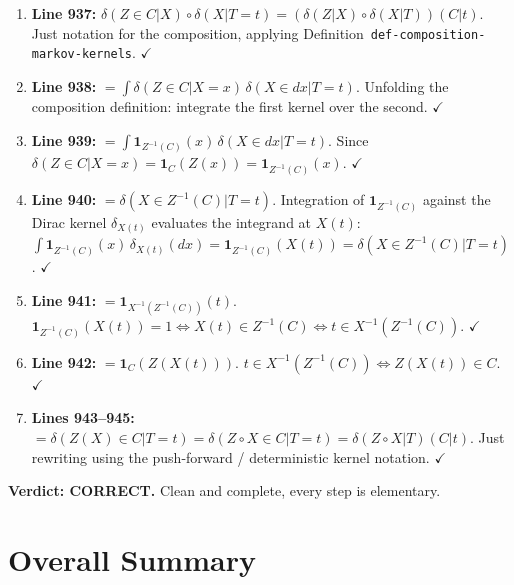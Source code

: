 \documentclass{article}
\begin{document}
\begin{enumerate}[leftmargin=*]
  \item \textbf{Line 937:}
    $\delta(Z\in C|X)\circ\delta(X|T=t) = (\delta(Z|X)\circ\delta(X|T))(C|t)$.
    Just notation for the composition, applying
    Definition~\texttt{def-composition-markov-kernels}.  $\checkmark$

  \item \textbf{Line 938:}
    $= \int \delta(Z\in C|X=x)\,\delta(X\in dx|T=t)$.
    Unfolding the composition definition: integrate the first kernel over the
    second.  $\checkmark$

  \item \textbf{Line 939:}
    $= \int \mathbf{1}_{Z^{-1}(C)}(x)\,\delta(X\in dx|T=t)$.
    Since $\delta(Z\in C|X=x) = \mathbf{1}_C(Z(x)) = \mathbf{1}_{Z^{-1}(C)}(x)$.
    $\checkmark$

  \item \textbf{Line 940:}
    $= \delta(X\in Z^{-1}(C)|T=t)$.
    Integration of $\mathbf{1}_{Z^{-1}(C)}$ against the Dirac kernel $\delta_{X(t)}$
    evaluates the integrand at $X(t)$:
    $\int\mathbf{1}_{Z^{-1}(C)}(x)\,\delta_{X(t)}(dx)
     = \mathbf{1}_{Z^{-1}(C)}(X(t))
     = \delta(X\in Z^{-1}(C)|T=t)$.  $\checkmark$

  \item \textbf{Line 941:}
    $= \mathbf{1}_{X^{-1}(Z^{-1}(C))}(t)$.
    $\mathbf{1}_{Z^{-1}(C)}(X(t)) = 1 \iff X(t)\in Z^{-1}(C) \iff
    t\in X^{-1}(Z^{-1}(C))$.  $\checkmark$

  \item \textbf{Line 942:}
    $= \mathbf{1}_C(Z(X(t)))$.
    $t\in X^{-1}(Z^{-1}(C)) \iff Z(X(t))\in C$.  $\checkmark$

  \item \textbf{Lines 943--945:}
    $= \delta(Z(X)\in C|T=t) = \delta(Z\circ X\in C|T=t) = \delta(Z\circ X|T)(C|t)$.
    Just rewriting using the push-forward / deterministic kernel notation.
    $\checkmark$
\end{enumerate}

\textbf{Verdict: CORRECT.}  Clean and complete, every step is elementary.

\section*{Overall Summary}
\end{document}
